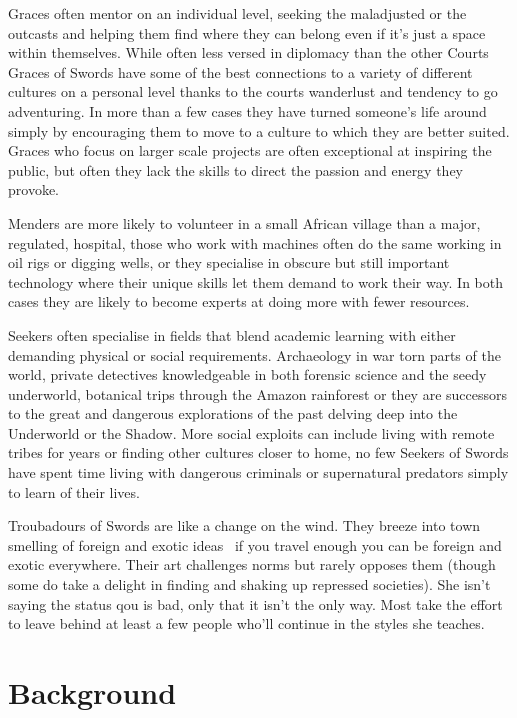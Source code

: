 Graces often mentor on an individual level, seeking the maladjusted or the outcasts and helping them find where they can belong even if it's just a space within themselves. While often less versed in diplomacy than the other Courts Graces of Swords have some of the best connections to a variety of different cultures on a personal level thanks to the courts wanderlust and tendency to go adventuring. In more than a few cases they have turned someone's life around simply by encouraging them to move to a culture to which they are better suited. Graces who focus on larger scale projects are often exceptional at inspiring the public, but often they lack the skills to direct the passion and energy they provoke.

Menders are more likely to volunteer in a small African village than a major, regulated, hospital, those who work with machines often do the same working in oil rigs or digging wells, or they specialise in obscure but still important technology where their unique skills let them demand to work their way. In both cases they are likely to become experts at doing more with fewer resources.

Seekers often specialise in fields that blend academic learning with either demanding physical or social requirements. Archaeology in war torn parts of the world, private detectives knowledgeable in both forensic science and the seedy underworld, botanical trips through the Amazon rainforest or they are successors to the great and dangerous explorations of the past delving deep into the Underworld or the Shadow. More social exploits can include living with remote tribes for years or finding other cultures closer to home, no few Seekers of Swords have spent time living with dangerous criminals or supernatural predators simply to learn of their lives.

Troubadours of Swords are like a change on the wind. They breeze into town smelling of foreign and exotic ideas \textendash\, if you travel enough you can be foreign and exotic everywhere. Their art challenges norms but rarely opposes them (though some do take a delight in finding and shaking up repressed societies). She isn't saying the status qou is bad, only that it isn't the only way. Most take the effort to leave behind at least a few people who'll continue in the styles she teaches. 

\section*{Background}

